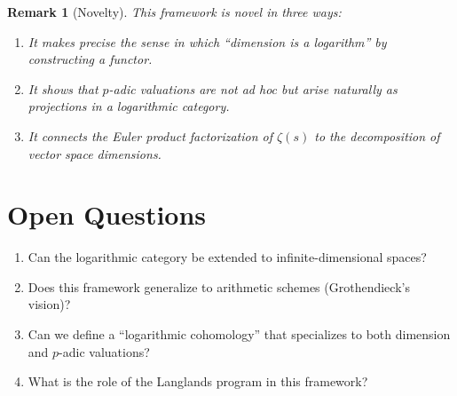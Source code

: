 \documentclass[11pt]{article}
\newtheorem{remark}[definition]{Remark}
\begin{document}
\begin{remark}[Novelty]
This framework is novel in three ways:
\begin{enumerate}
\item It makes precise the sense in which ``dimension is a logarithm'' by constructing a functor.
\item It shows that $p$-adic valuations are not ad hoc but arise naturally as projections in a logarithmic category.
\item It connects the Euler product factorization of $\zeta(s)$ to the decomposition of vector space dimensions.
\end{enumerate}
\end{remark}

\section{Open Questions}
\label{sec:open}

\begin{enumerate}
\item Can the logarithmic category be extended to infinite-dimensional spaces?
\item Does this framework generalize to arithmetic schemes (Grothendieck's vision)?
\item Can we define a ``logarithmic cohomology'' that specializes to both dimension and $p$-adic valuations?
\item What is the role of the Langlands program in this framework?
\end{enumerate}
\end{document}
